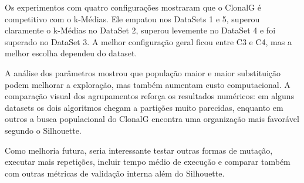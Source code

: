 \documentclass[12pt,a4paper]{article}
\begin{document}
Os experimentos com quatro configurações mostraram que o ClonalG é competitivo com o k-Médias. Ele empatou nos DataSets 1 e 5, superou claramente o k-Médias no DataSet 2, superou levemente no DataSet 4 e foi superado no DataSet 3. A melhor configuração geral ficou entre C3 e C4, mas a melhor escolha dependeu do dataset.

A análise dos parâmetros mostrou que população maior e maior substituição podem melhorar a exploração, mas também aumentam custo computacional. A comparação visual dos agrupamentos reforça os resultados numéricos: em alguns datasets os dois algoritmos chegam a partições muito parecidas, enquanto em outros a busca populacional do ClonalG encontra uma organização mais favorável segundo o Silhouette.

Como melhoria futura, seria interessante testar outras formas de mutação, executar mais repetições, incluir tempo médio de execução e comparar também com outras métricas de validação interna além do Silhouette.
\end{document}
